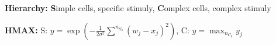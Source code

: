 \textbf{Hierarchy:} \textbf{S}imple cells, specific stimuly, \textbf{C}omplex cells, complex stimuly\\

\textbf{HMAX:} S: $y = \exp(- \frac{1}{2\sigma^2} \sum^{n_{S_k}} (w_j - x_j)^2)$, C: $y = \max_{n_{C_k}} y_j$\\

